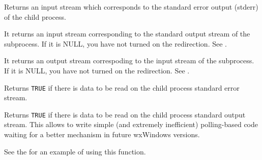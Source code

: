 \label{wxprocessgeterrorstream}


Returns an input stream which corresponds to the standard error output (stderr)
of the child process.

\label{wxprocessgetinputstream}


It returns an input stream corresponding to the standard output stream of the
subprocess. If it is NULL, you have not turned on the redirection.
See .

\label{wxprocessgetoutputstream}


It returns an output stream correspoding to the input stream of the subprocess.
If it is NULL, you have not turned on the redirection.
See .

\label{wxprocessiserroravailable}


Returns {\tt TRUE} if there is data to be read on the child process standard
error stream.



\label{wxprocessisinputavailable}


Returns {\tt TRUE} if there is data to be read on the child process standard
output stream. This allows to write simple (and extremely inefficient)
polling-based code waiting for a better mechanism in future wxWindows versions.

See the  for an example of using this
function.



\label{wxprocessisinputopened}


